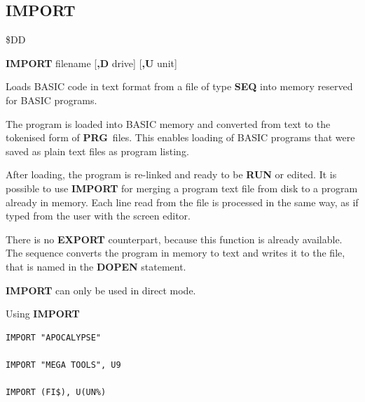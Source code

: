 \newpage
\subsection{IMPORT}
\begin{description}[leftmargin=2cm,style=nextline]
\item [Token:]    \$DD

\item [Format:]   {\bf IMPORT} filename [{\bf,D} drive] [{\bf,U} unit]

\item [Usage:]    Loads BASIC code in text format from a file of type {\bf SEQ} into memory reserved for BASIC programs.

                  \filenamedefinition

                  \drivedefinition

                  \unitdefinition

\item [Remarks:]  The program is loaded into BASIC memory and converted from text to the tokenised form of {\bf PRG} files. This enables loading of BASIC programs that were saved as plain text files as program listing.

                  After loading, the program is re-linked and ready to be {\bf RUN} or edited. It is possible to use {\bf IMPORT} for merging a program text file from disk to a program already in memory. Each line read from the file is processed in the same way, as if typed from the user with the screen editor.

                  There is no {\bf EXPORT} counterpart, because this function is already available. The sequence  converts the program in memory to text and writes it to the file, that is named in the {\bf DOPEN} statement.

                  {\bf IMPORT} can only be used in direct mode.

\item [Examples:] Using {\bf IMPORT}

\begin{tcolorbox}[colback=black,coltext=white]
\verbatimfont{\codefont}
\begin{verbatim}
IMPORT "APOCALYPSE"

IMPORT "MEGA TOOLS", U9

IMPORT (FI$), U(UN%)
\end{verbatim}
\end{tcolorbox}
\end{description}

